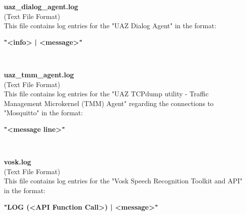 \begin{description}
\begin{addmargin}[0em]{0em}
    \label{uaz_dialog_agent.log}
    \begin{addmargin}[1em]{0em} %
        \textbf{uaz\_dialog\_agent.log}\\
        (Text File Format)\\
        This file contains log entries for the "UAZ Dialog Agent" in the format:
        \begin{addmargin}[1em]{0em}
            \textbf{"<info> | <message>"}
        \end{addmargin}
    \end{addmargin} %
    \textbf{\\}

    \label{uaz_tmm_agent.log}
    \begin{addmargin}[1em]{0em} %
        \textbf{uaz\_tmm\_agent.log}\\
        (Text File Format)\\
        This file contains log entries for the "UAZ TCPdump utility - Traffic Management Microkernel (TMM) Agent"
        regarding the connections to "Mosquitto" in the format:
        \begin{addmargin}[1em]{0em}
            \textbf{"<message line>"}
        \end{addmargin}
    \end{addmargin} %
    \textbf{\\}

    \label{vosk.log}
    \begin{addmargin}[1em]{0em} %
        \textbf{vosk.log}\\
        (Text File Format)\\
        This file contains log entries for the "Vosk Speech Recognition Toolkit and API" in the format:
        \begin{addmargin}[1em]{0em}
            \textbf{"LOG (<API Function Call>) | <message>"}
        \end{addmargin}
    \end{addmargin} %
    \textbf{\\}

\end{addmargin} %



\end{description}
